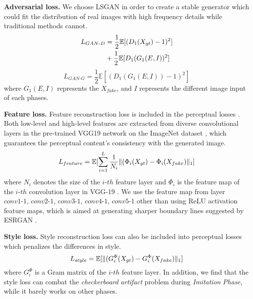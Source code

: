 \documentclass[10pt,twocolumn,letterpaper]{article} \usepackage{amsfonts,amssymb}
\begin{document}
{\bf Adversarial loss.}
We choose LSGAN \cite{mao2017least} in order to create a stable generator which could fit the distribution of real images with high frequency details while traditional methods cannot.
\begin{align}
\label{Adversarial Loss}
L_{GAN\text{-}D} &= \frac{1}{2} \mathbb{E}[(D_1(X_{gt})-1)^2] \\
&+ \frac{1}{2}\mathbb{E}[D_1(G_1(E,I))^2]\notag
\end{align}
\begin{equation}
L_{GAN\text{-}G} = \frac{1}{2} \mathbb{E}[(D_1(G_1(E,I))-1)^2]
\end{equation}
where $G_1(E,I)$ represents the $X_{fake}$, and $I$ represents the different image input of each phases.

{\bf Feature loss.}
Feature reconstruction loss is included in the perceptual losses \cite{johnson2016perceptual}. Both low-level and high-level features are extracted from diverse convolutional layers in the pre-trained VGG19 network \cite{simonyan2014very} on the ImageNet dataset \cite{russakovsky2015imagenet}, which guarantees the perceptual content's consistency with the generated image.
\begin{equation}
L_{feature} =  \mathbb{E}[\sum_{i=1}^{L} \frac{1}{N_i}\Arrowvert(\Phi_i(X_{gt})-\Phi_i(X_{fake})\Arrowvert _{1}]
\end{equation}
where ${N_i}$ denotes the size of the $i\text{-}th$ feature layer and  $\Phi_i$ is the feature map of the $i\text{-}th$ convolution layer in VGG-19 \cite{simonyan2014very}. We use the feature map from layer $conv1\text{-}1$, $conv2\text{-}1$, $conv3\text{-}1$, $conv4\text{-}1$, $conv5\text{-}1$ other than using ReLU \cite{nair2010rectified} activation feature maps, which is aimed at generating sharper boundary lines suggested by ESRGAN \cite{wang2018esrgan}.

{\bf Style loss.}
Style reconstruction loss can also be included into perceptual losses \cite{johnson2016perceptual} which penalizes the differences in style.
\begin{equation}
L_{style} =  \mathbb{E}[\Arrowvert(G_{i}^{\Phi}(X_{gt})-G_{i}^{\Phi}(X_{fake})\Arrowvert _{1}]
\end{equation}
where  $G_{i}^{\Phi}$ is a Gram matrix of the $i\text{-}th$ feature layer. In addition, we find that the style loss can combat  the \emph{checkerboard} \emph{artifact} \cite{odena2016deconvolution} problem during \emph{Imitation} \emph{Phase}, while it barely works on other phases.
\end{document}
